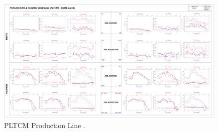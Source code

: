 \begin{landscape}
\begin{figure}[ht]
	\centering
	\includegraphics[width=1.35\textwidth]{../images/supplements-PLTCM_real_life_events_analysis-results-curves_and_time_resolutions.png}
	\caption{PLTCM Production Line \cc{} \dd{}.}
	\label{figure-supplements-PLTCM-curveplots_sliding}
\end{figure}
\end{landscape}